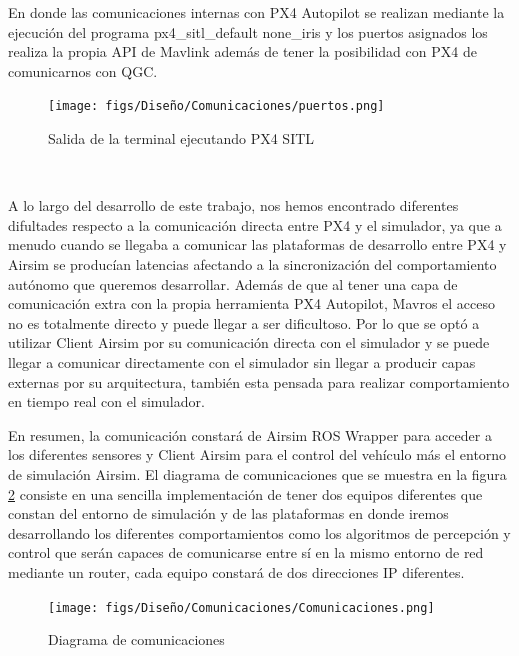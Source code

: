 En donde las comunicaciones internas con PX4 Autopilot se realizan mediante la ejecución del programa px4\_sitl\_default none\_iris y los puertos asignados los realiza la propia
API de Mavlink además de tener la posibilidad con PX4 de comunicarnos con QGC.

\begin{figure} [H]
  \begin{center}
    \texttt{[image: figs/Diseño/Comunicaciones/puertos.png]}
  \end{center}
  \caption{Salida de la terminal ejecutando PX4 SITL}
  \label{fig:SalidaTerminal}
\end{figure}\

A lo largo del desarrollo de este trabajo, nos hemos encontrado diferentes difultades respecto a la comunicación directa entre PX4 y el simulador, ya que a menudo cuando se llegaba a 
comunicar las plataformas de desarrollo entre PX4 y Airsim se producían latencias afectando a la sincronización del comportamiento autónomo que queremos desarrollar. Además de que al tener
una capa de comunicación extra con la propia herramienta PX4 Autopilot, Mavros el acceso no es totalmente directo y puede llegar a ser dificultoso. Por lo que se optó a utilizar 
Client Airsim por su comunicación directa con el simulador y se puede llegar a comunicar directamente con el simulador sin llegar a producir capas externas por su arquitectura, también
esta pensada para realizar comportamiento en tiempo real con el simulador.  \newline

En resumen, la comunicación constará de Airsim ROS Wrapper para acceder a los diferentes sensores y Client Airsim para el control del vehículo más el entorno
de simulación Airsim. El diagrama de comunicaciones que se muestra en la figura \ref{fig:diagramadeAirsim} consiste en una sencilla implementación de tener dos equipos diferentes que
constan del entorno de simulación y de las plataformas en donde iremos desarrollando los diferentes comportamientos como los algoritmos de percepción y control que serán capaces
de comunicarse entre sí en la mismo entorno de red mediante un router, cada equipo constará de dos direcciones IP diferentes. 

\begin{figure} [H]
  \begin{center}
    \texttt{[image: figs/Diseño/Comunicaciones/Comunicaciones.png]}
  \end{center}
  \caption{Diagrama de comunicaciones}
  \label{fig:diagramadeAirsim}
\end{figure}\

